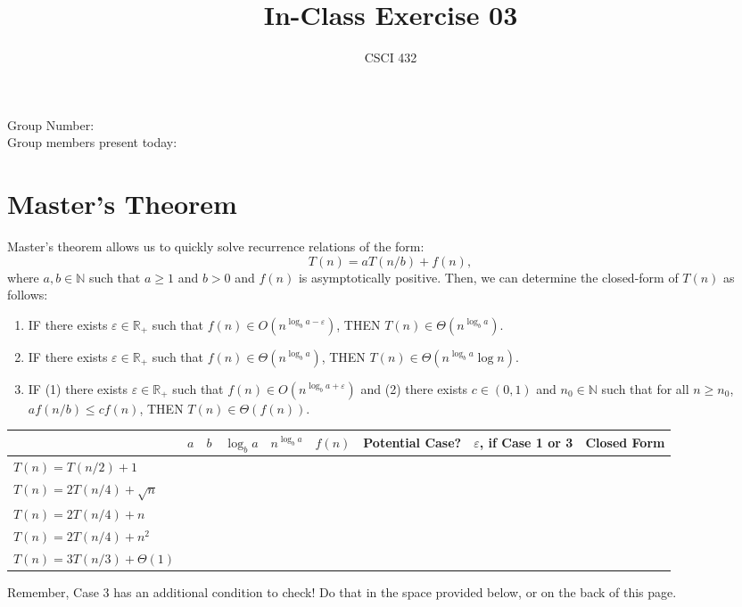 \documentclass{article}
\title{In-Class Exercise 03}
\author{CSCI 432}
\def\R{{\mathbb R}}
\def\N{{\mathbb N}}
\begin{document}
\maketitle

\noindent
Group Number:\\
Group members present today:

\section*{Master's Theorem}

Master's theorem allows us to quickly solve recurrence relations of the form:
$$ T(n) = a T(n/b) + f(n),$$
where $a, b \in \N$ such that $a \geq 1$ and $b >0$ and $f(n)$ is asymptotically
positive.  Then, we can determine the closed-form of $T(n)$ as follows:
\begin{enumerate}
    \item IF there exists $\varepsilon \in \R_+$ such that $f(n) \in O(n^{\log_b
        a - \varepsilon})$, THEN $T(n) \in \Theta(n^{\log_b a})$.
    \item IF there exists $\varepsilon \in \R_+$ such that $f(n) \in \Theta(n^{\log_b
        a})$, THEN $T(n) \in \Theta(n^{\log_b a}\log n)$.
    \item IF (1) there exists $\varepsilon \in \R_+$ such that $f(n) \in O(n^{\log_b
        a + \varepsilon})$
        and (2) there exists $c \in (0,1)$ and $n_0 \in \N$ such that for all $n
        \geq n_0$, $a f(n/b) \leq c f(n)$, THEN $T(n) \in \Theta(f(n))$.
\end{enumerate}

\begin{table}[h!]
    \centering
    \begin{tabular}{|l|l|l|l|l|l|l|l|l|}
        \hline
        &  $a$ & $b$  & $\log_b a$  & $n^{\log_b a}$  & $f(n)$  & Potential
        Case? & $\varepsilon$, if Case 1 or 3  & Closed Form \\ \hline
        \hline
        $T(n) = T(n/2)+1$             & &  &  &  &  & & & \\[5ex] \hline
        $T(n) = 2 T(n/4) + \sqrt{n}$  & &  &  &  & &  & & \\[5ex] \hline
        $T(n) = 2 T(n/4) + n$         & &  &  &  &  & & &  \\[5ex] \hline
        $T(n) = 2 T(n/4) + n^2$       & &  &  &  &  & & & \\[5ex] \hline
        $T(n) = 3 T(n/3) + \Theta(1)$ & &  &  &  & & & & \\[5ex] \hline
    \end{tabular}
\end{table}
Remember, Case 3 has an additional condition to check! Do that in the space
provided below, or on the back of this page.\\
\fbox{\begin{minipage}{6.5in}\hfill\vspace{1in}\end{minipage}}
\end{document}
